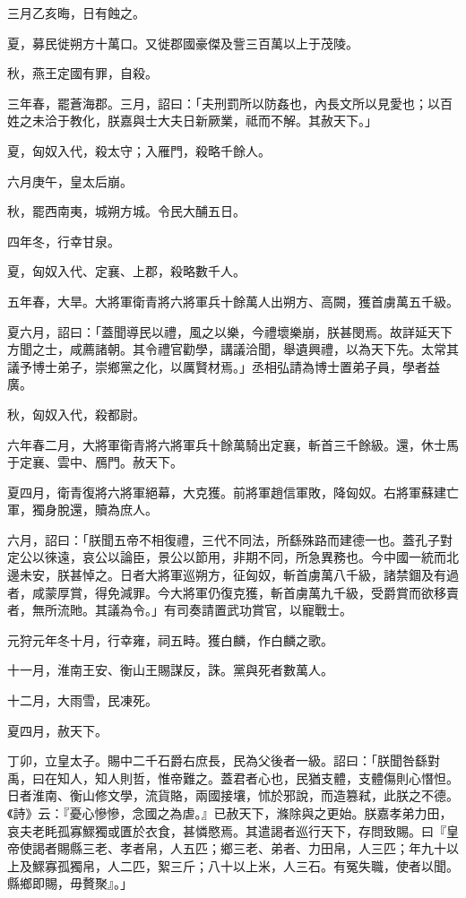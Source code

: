 \begin{pinyinscope}
三月乙亥晦，日有蝕之。

夏，募民徙朔方十萬口。又徙郡國豪傑及訾三百萬以上于茂陵。

秋，燕王定國有罪，自殺。

三年春，罷蒼海郡。三月，詔曰：「夫刑罰所以防姦也，內長文所以見愛也；以百姓之未洽于教化，朕嘉與士大夫日新厥業，祗而不解。其赦天下。」

夏，匈奴入代，殺太守；入雁門，殺略千餘人。

六月庚午，皇太后崩。

秋，罷西南夷，城朔方城。令民大酺五日。

四年冬，行幸甘泉。

夏，匈奴入代、定襄、上郡，殺略數千人。

五年春，大旱。大將軍衛青將六將軍兵十餘萬人出朔方、高闕，獲首虜萬五千級。

夏六月，詔曰：「蓋聞導民以禮，風之以樂，今禮壞樂崩，朕甚閔焉。故詳延天下方聞之士，咸薦諸朝。其令禮官勸學，講議洽聞，舉遺興禮，以為天下先。太常其議予博士弟子，崇鄉黨之化，以厲賢材焉。」丞相弘請為博士置弟子員，學者益廣。

秋，匈奴入代，殺都尉。

六年春二月，大將軍衛青將六將軍兵十餘萬騎出定襄，斬首三千餘級。還，休士馬于定襄、雲中、鴈門。赦天下。

夏四月，衛青復將六將軍絕幕，大克獲。前將軍趙信軍敗，降匈奴。右將軍蘇建亡軍，獨身脫還，贖為庶人。

六月，詔曰：「朕聞五帝不相復禮，三代不同法，所繇殊路而建德一也。蓋孔子對定公以徠遠，哀公以論臣，景公以節用，非期不同，所急異務也。今中國一統而北邊未安，朕甚悼之。日者大將軍巡朔方，征匈奴，斬首虜萬八千級，諸禁錮及有過者，咸蒙厚賞，得免減罪。今大將軍仍復克獲，斬首虜萬九千級，受爵賞而欲移賣者，無所流貤。其議為令。」有司奏請置武功賞官，以寵戰士。

元狩元年冬十月，行幸雍，祠五畤。獲白麟，作白麟之歌。

十一月，淮南王安、衡山王賜謀反，誅。黨與死者數萬人。

十二月，大雨雪，民凍死。

夏四月，赦天下。

丁卯，立皇太子。賜中二千石爵右庶長，民為父後者一級。詔曰：「朕聞咎繇對禹，曰在知人，知人則哲，惟帝難之。蓋君者心也，民猶支體，支體傷則心憯怛。日者淮南、衡山修文學，流貨賂，兩國接壤，怵於邪說，而造篡弒，此朕之不德。《詩》云：『憂心慘慘，念國之為虐。』已赦天下，滌除與之更始。朕嘉孝弟力田，哀夫老眊孤寡鰥獨或匱於衣食，甚憐愍焉。其遣謁者巡行天下，存問致賜。曰『皇帝使謁者賜縣三老、孝者帛，人五匹；鄉三老、弟者、力田帛，人三匹；年九十以上及鰥寡孤獨帛，人二匹，絮三斤；八十以上米，人三石。有冤失職，使者以聞。縣鄉即賜，毋贅聚』。」


\end{pinyinscope}
